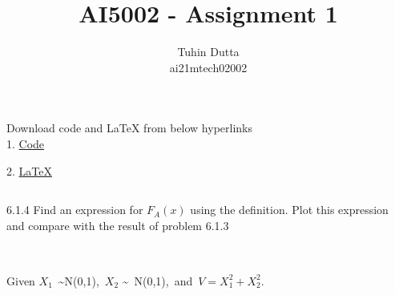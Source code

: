 \documentclass[journal,12pt,twocolumn]{IEEEtran}
\begin{document}
\providecommand{\mtx}[1]{\mathbf{#1}}
\providecommand{\fourier}{\overset{\mathcal{F}}{ \rightleftharpoons}}
\providecommand{\system}{\overset{\mathcal{H}}{ \longleftrightarrow}}
\newcommand{\solution}{\noindent \textbf{Solution: }}
\newcommand{\cosec}{\,\text{cosec}\,}
\providecommand{\dec}[2]{\ensuremath{\overset{#1}{\underset{#2}{\gtrless}}}}
\newcommand{\myvec}[1]{\ensuremath{\begin{pmatrix}#1\end{pmatrix}}}
\newcommand{\mydet}[1]{\ensuremath{\begin{vmatrix}#1\end{vmatrix}}}
\makeatletter
{}
\makeatother
\let\StandardTheFigure\thefigure
\let\vec\mathbf
\renewcommand{\thefigure}{\theproblem}
\def\putbox#1#2#3{\makebox[0in][l]{\makebox[#1][l]{}\raisebox{\baselineskip}[0in][0in]{\raisebox{#2}[0in][0in]{#3}}}}
     \def\rightbox#1{\makebox[0in][r]{#1}}
     \def\centbox#1{\makebox[0in]{#1}}
     \def\topbox#1{\raisebox{-\baselineskip}[0in][0in]{#1}}
     \def\midbox#1{\raisebox{-0.5\baselineskip}[0in][0in]{#1}}
\vspace{3cm}
\title{AI5002 - Assignment 1}
\author{Tuhin Dutta\\ ai21mtech02002}
\maketitle
\newpage
\bigskip
\renewcommand{\thefigure}{\theenumi}
\renewcommand{\thetable}{\theenumi}
\begin{mdframed}
Download code and LaTeX from below hyperlinks\\
1. \href{https://github.com/Tauhait/AI5002/Assignment-1/Code}{Code}


2. \href{https://github.com/Tauhait/AI5002/Assignment-1/LaTeX}{LaTeX}
\end{mdframed}
\subsection*{}

6.1.4 Find an expression for $F_A(x)$ using the definition. Plot this expression and compare with the result of problem 6.1.3\\

\subsection*{}\\
Given $X_1$\ \sim N(0,1),\ $X_2$ \sim\ N(0,1),\ and\ $V = X_1^2 + X_2^2$.\\
\end{document}
